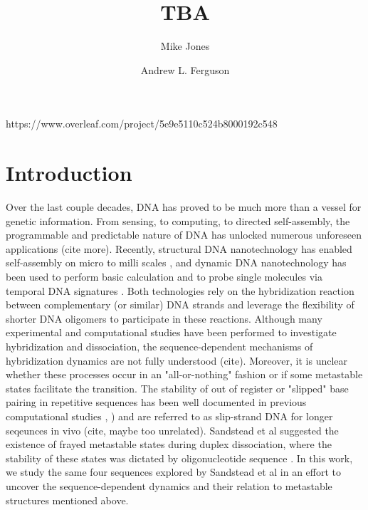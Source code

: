 \documentclass[journal=jpcbfk,manuscript=article]{achemso}
\author{Mike Jones}
\affiliation{%
  Pritzker School of Molecular Engineering, %
  University of Chicago, %
  Chicago, Illinois 60637%
}
\author{Andrew L. Ferguson}
\affiliation{%
  Pritzker School of Molecular Engineering, %
  University of Chicago, %
  Chicago, Illinois 60637%
}
\title[]{TBA}
\begin{document}

\newpage

\begin{abstract}

\noindent 

\end{abstract}
https://www.overleaf.com/project/5e9e5110c524b8000192c548

\newpage

\section{\label{sec:intro}Introduction}

Over the last couple decades, DNA has proved to be much more than a vessel for genetic information. From sensing, to computing, to directed self-assembly, the programmable and predictable nature of DNA has unlocked numerous unforeseen applications \citep{Seeman2017DNANanotechnology} (cite more). Recently, structural DNA nanotechnology has enabled self-assembly on micro to milli scales \citep{MhatreV.HoJi-AnnLee2012NIHAccess}, and dynamic DNA nanotechnology has been used to perform basic calculation \citep{Bui2018} and to probe single molecules via temporal DNA signatures \citep{Shah2019}. Both technologies rely on the hybridization reaction between complementary (or similar) DNA strands and leverage the flexibility of shorter DNA oligomers to participate in these reactions. Although many experimental and computational studies have been performed to investigate hybridization and dissociation, the sequence-dependent mechanisms of hybridization dynamics are not fully understood (cite). Moreover, it is unclear whether these processes occur in an "all-or-nothing" fashion or if some metastable states facilitate the transition. The stability of out of register or "slipped" base pairing in repetitive sequences has been well documented in previous computational studies \citep{Phys2014}, \citep{Xiao2019}) and are referred to as slip-strand DNA for longer seqeunces in vivo (cite, maybe too unrelated). Sandstead et al suggested the existence of frayed metastable states during duplex dissociation, where the stability of these states was dictated by oligonucleotide sequence \citep{Sanstead2016}. In this work, we study the same four sequences explored by Sandstead et al in an effort to uncover the sequence-dependent dynamics and their relation to  metastable structures mentioned above.
\end{document}
